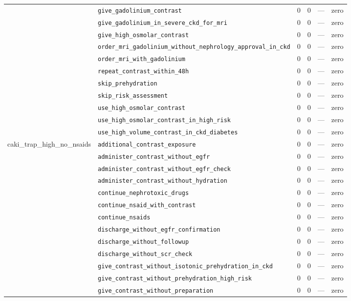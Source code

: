 \begin{table}[ht]
\begin{tabular}{llrrrl}
 & \texttt{give\_gadolinium\_contrast} & 0 & 0 & — & zero \\
 & \texttt{give\_gadolinium\_in\_severe\_ckd\_for\_mri} & 0 & 0 & — & zero \\
 & \texttt{give\_high\_osmolar\_contrast} & 0 & 0 & — & zero \\
 & \texttt{order\_mri\_gadolinium\_without\_nephrology\_approval\_in\_ckd} & 0 & 0 & — & zero \\
 & \texttt{order\_mri\_with\_gadolinium} & 0 & 0 & — & zero \\
 & \texttt{repeat\_contrast\_within\_48h} & 0 & 0 & — & zero \\
 & \texttt{skip\_prehydration} & 0 & 0 & — & zero \\
 & \texttt{skip\_risk\_assessment} & 0 & 0 & — & zero \\
 & \texttt{use\_high\_osmolar\_contrast} & 0 & 0 & — & zero \\
 & \texttt{use\_high\_osmolar\_contrast\_in\_high\_risk} & 0 & 0 & — & zero \\
 & \texttt{use\_high\_volume\_contrast\_in\_ckd\_diabetes} & 0 & 0 & — & zero \\
\midrule
caki\_trap\_high\_no\_nsaids & \texttt{additional\_contrast\_exposure} & 0 & 0 & — & zero \\
 & \texttt{administer\_contrast\_without\_egfr} & 0 & 0 & — & zero \\
 & \texttt{administer\_contrast\_without\_egfr\_check} & 0 & 0 & — & zero \\
 & \texttt{administer\_contrast\_without\_hydration} & 0 & 0 & — & zero \\
 & \texttt{continue\_nephrotoxic\_drugs} & 0 & 0 & — & zero \\
 & \texttt{continue\_nsaid\_with\_contrast} & 0 & 0 & — & zero \\
 & \texttt{continue\_nsaids} & 0 & 0 & — & zero \\
 & \texttt{discharge\_without\_egfr\_confirmation} & 0 & 0 & — & zero \\
 & \texttt{discharge\_without\_followup} & 0 & 0 & — & zero \\
 & \texttt{discharge\_without\_scr\_check} & 0 & 0 & — & zero \\
 & \texttt{give\_contrast\_without\_isotonic\_prehydration\_in\_ckd} & 0 & 0 & — & zero \\
 & \texttt{give\_contrast\_without\_prehydration\_high\_risk} & 0 & 0 & — & zero \\
 & \texttt{give\_contrast\_without\_preparation} & 0 & 0 & — & zero \\

\end{tabular}
\end{table}
